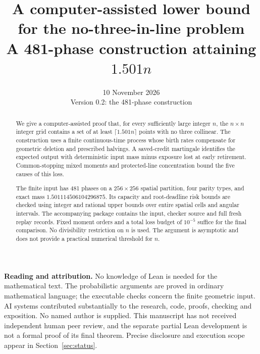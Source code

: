 \documentclass[11pt,a4paper]{article}
\title{\textbf{A computer-assisted lower bound\\for the no-three-in-line problem}\\[5pt]
\large A 481-phase construction attaining \(1.501n\)}
\author{}
\date{10 November 2026\\[3pt]\small Version 0.2: the 481-phase construction}
\theoremstyle{definition}
\begin{document}
\maketitle
\begin{abstract}
We give a computer-assisted proof that, for every sufficiently large integer
\(n\), the \(n\times n\) integer grid contains a set of at least
\(\lceil1.501n\rceil\) points with no three collinear. The construction uses
a finite continuous-time process whose birth rates compensate for geometric
deletion and prescribed halvings. A saved-credit martingale identifies the
expected output with deterministic input mass minus exposure lost at early
retirement. Common-stopping mixed moments and protected-line concentration
bound the five causes of this loss.

The finite input has 481 phases on a \(256\times256\) spatial partition,
four parity types, and exact mass \(1.501114506104296875\).
Its capacity and root-deadline risk bounds are checked using integer and
rational upper bounds over entire spatial cells and angular intervals.
The accompanying package contains the input, checker source and full fresh
replay records. Fixed moment orders and a total loss budget of \(10^{-5}\)
suffice for the final comparison. No divisibility restriction on \(n\) is
used. The argument is asymptotic and does not provide a practical numerical
threshold for \(n\).
\end{abstract}
\noindent\textbf{Reading and attribution.}
No knowledge of Lean is needed for the mathematical text.
The probabilistic arguments are proved in ordinary mathematical language;
the executable checks concern the finite geometric input.
AI systems contributed substantially to the research, code, proofs, checking
and exposition. No named author is supplied. This manuscript has not received
independent human peer review, and the separate partial Lean development is
not a formal proof of its final theorem. Precise disclosure and execution
scope appear in Section~\ref{sec:status}.
\tableofcontents
\newpage






\end{document}
